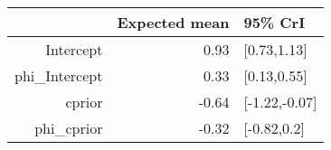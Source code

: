\begin{tabular}{rrl}
  \hline
 & Expected mean & 95\% CrI \\ 
  \hline
Intercept & 0.93 & [0.73,1.13] \\ 
  phi\_Intercept & 0.33 & [0.13,0.55] \\ 
  cprior & -0.64 & [-1.22,-0.07] \\ 
  phi\_cprior & -0.32 & [-0.82,0.2] \\ 
   \hline
\end{tabular}

